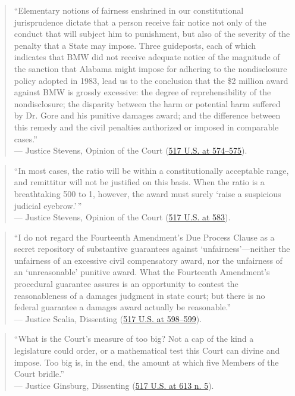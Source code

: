 \documentclass[12pt]{article}
\begin{document}
\begin{quote}
``Elementary notions of fairness enshrined in our constitutional jurisprudence dictate that a person receive fair notice not only of the conduct that will subject him to punishment, but also of the severity of the penalty that a State may impose. Three guideposts, each of which indicates that BMW did not receive adequate notice of the magnitude of the sanction that Alabama might impose for adhering to the nondisclosure policy adopted in 1983, lead us to the conclusion that the \$2 million award against BMW is grossly excessive: the degree of reprehensibility of the nondisclosure; the disparity between the harm or potential harm suffered by Dr. Gore and his punitive damages award; and the difference between this remedy and the civil penalties authorized or imposed in comparable cases.'' \\
--- Justice Stevens, Opinion of the Court (\href{https://supreme.justia.com/cases/federal/us/517/559/}{517 U.S. at 574--575}).
\end{quote}

\begin{quote}
``In most cases, the ratio will be within a constitutionally acceptable range, and remittitur will not be justified on this basis. When the ratio is a breathtaking 500 to 1, however, the award must surely `raise a suspicious judicial eyebrow.'\,'' \\
--- Justice Stevens, Opinion of the Court (\href{https://supreme.justia.com/cases/federal/us/517/559/}{517 U.S. at 583}).
\end{quote}

\begin{quote}
``I do not regard the Fourteenth Amendment's Due Process Clause as a secret repository of substantive guarantees against `unfairness'---neither the unfairness of an excessive civil compensatory award, nor the unfairness of an `unreasonable' punitive award. What the Fourteenth Amendment's procedural guarantee assures is an opportunity to contest the reasonableness of a damages judgment in state court; but there is no federal guarantee a damages award actually be reasonable.'' \\
--- Justice Scalia, Dissenting (\href{https://supreme.justia.com/cases/federal/us/517/559/}{517 U.S. at 598--599}).
\end{quote}

\begin{quote}
``What is the Court's measure of too big? Not a cap of the kind a legislature could order, or a mathematical test this Court can divine and impose. Too big is, in the end, the amount at which five Members of the Court bridle.'' \\
--- Justice Ginsburg, Dissenting (\href{https://supreme.justia.com/cases/federal/us/517/559/}{517 U.S. at 613 n. 5}).
\end{quote}
\end{document}
